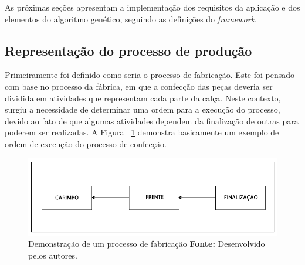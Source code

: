 \begin{itemize}
	
	
	
\end{itemize}

\par As próximas seções apresentam a implementação dos requisitos da aplicação
e dos elementos do algoritmo genético, seguindo as definições do \textit{framework}.

\subsection{Representação do processo de produção}

\par Primeiramente foi definido como seria o processo de fabricação. Este foi pensado com base no 
processo da fábrica, em que a confecção das peças deveria ser dividida em atividades que representam
cada parte da calça. Neste contexto, surgiu a necessidade de determinar uma ordem para a execução do processo, 
devido ao fato de que algumas atividades dependem da finalização de outras para poderem ser
realizadas. A Figura ~\ref{fig:processo_fabricacao} demonstra basicamente um
exemplo de ordem de execução do processo de confecção.


\begin{figure}[h!]
	\centerline{\includegraphics[scale=0.5]{./imagens/processo1.png}}
	\caption[Demonstração de um processo de fabricação]
	{Demonstração de um processo de fabricação \textbf{Fonte:} Desenvolvido pelos
	autores.}
	\label{fig:processo_fabricacao}
\end{figure}

